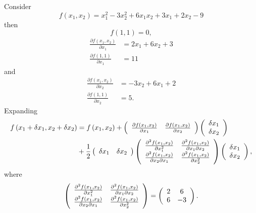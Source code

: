 \documentclass[aps,preprint]{revtex4}%
\begin{document}
Consider
\begin{equation}
f\left(  x_{1},x_{2}\right)  =x_{1}^{2}-3x_{2}^{2}+6x_{1}x_{2}+3x_{1}+2x_{2}-9
\end{equation}
then
\begin{equation}
f\left(  1,1\right)  =0,
\end{equation}%
\begin{align}
\frac{\partial f\left(  x_{1},x_{2}\right)  }{\partial x_{1}} &
=2x_{1}+6x_{2}+3\\
\frac{\partial f\left(  1,1\right)  }{\partial x_{1}} &  =11
\end{align}
and
\begin{align}
\frac{\partial f\left(  x_{1},x_{2}\right)  }{\partial x_{2}} &
=-3x_{2}+6x_{1}+2\\
\frac{\partial f\left(  1,1\right)  }{\partial x_{2}} &  =5.
\end{align}
Expanding
\begin{align}
f\left(  x_{1}+\delta x_{1},x_{2}+\delta x_{2}\right)   &  =f\left(
x_{1},x_{2}\right)  +\left(
\begin{array}
[c]{cc}%
\frac{\partial f\left(  x_{1},x_{2}\right)  }{\partial x_{1}} & \frac{\partial
f\left(  x_{1},x_{2}\right)  }{\partial x_{2}}%
\end{array}
\right)  \left(
\begin{array}
[c]{c}%
\delta x_{1}\\
\delta x_{2}%
\end{array}
\right)  \\
&  +\frac{1}{2}\left(
\begin{array}
[c]{cc}%
\delta x_{1} & \delta x_{2}%
\end{array}
\right)  \left(
\begin{array}
[c]{cc}%
\frac{\partial^{2}f\left(  x_{1},x_{2}\right)  }{\partial x_{1}^{2}} &
\frac{\partial^{2}f\left(  x_{1},x_{2}\right)  }{\partial x_{1}\partial x_{2}%
}\\
\frac{\partial^{2}f\left(  x_{1},x_{2}\right)  }{\partial x_{2}\partial x_{1}}
& \frac{\partial^{2}f\left(  x_{1},x_{2}\right)  }{\partial x_{2}^{2}}%
\end{array}
\right)  \left(
\begin{array}
[c]{c}%
\delta x_{1}\\
\delta x_{2}%
\end{array}
\right)  ,
\end{align}
where
\begin{equation}
\left(
\begin{array}
[c]{cc}%
\frac{\partial^{2}f\left(  x_{1},x_{2}\right)  }{\partial x_{1}^{2}} &
\frac{\partial^{2}f\left(  x_{1},x_{2}\right)  }{\partial x_{1}\partial x_{2}%
}\\
\frac{\partial^{2}f\left(  x_{1},x_{2}\right)  }{\partial x_{2}\partial x_{1}}
& \frac{\partial^{2}f\left(  x_{1},x_{2}\right)  }{\partial x_{2}^{2}}%
\end{array}
\right)  =\left(
\begin{array}
[c]{cc}%
2 & 6\\
6 & -3
\end{array}
\right)  .
\end{equation}
\end{document}
